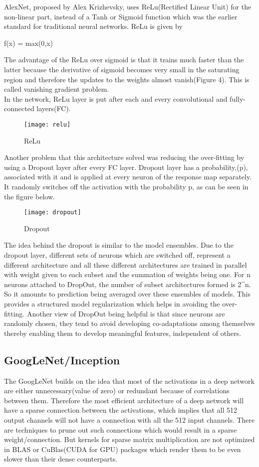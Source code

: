 \documentclass[../main.tex]{subfiles}
\begin{document}
AlexNet, proposed by Alex Krizhevsky, uses ReLu(Rectified Linear Unit) for the non-linear part, instead of a Tanh or Sigmoid function which was the earlier standard for traditional neural networks. ReLu is given by 

f(x) = max(0,x)

The advantage of the ReLu over sigmoid is that it trains much faster than the latter because the derivative of sigmoid becomes very small in the saturating region and therefore the updates to the weights almost vanish(Figure 4). This is called vanishing gradient problem.\\
In the network, ReLu layer is put after each and every convolutional and fully-connected layers(FC).

\begin{figure}[htbp] 
\centering 
\texttt{[image: relu]}
\caption{ReLu} 
\label{relu} 
\end{figure}
Another problem that this architecture solved was reducing the over-fitting by using a Dropout layer after every FC layer. Dropout layer has a probability,(p), associated with it and is applied at every neuron of the response map separately. It randomly switches off the activation with the probability p, as can be seen in the figure below.  

\begin{figure}[htbp] 
\centering 
\texttt{[image: dropout]}
\caption{Dropout} 
\label{dropout} 
\end{figure}
The idea behind the dropout is similar to the model ensembles. Due to the dropout layer, different sets of neurons which are switched off, represent a different architecture and all these different architectures are trained in parallel with weight given to each subset and the summation of weights being one. For n neurons attached to DropOut, the number of subset architectures formed is 2^n. So it amounts to prediction being averaged over these ensembles of models. This provides a structured model regularization which helps in avoiding the over-fitting. Another view of DropOut being helpful is that since neurons are randomly chosen, they tend to avoid developing co-adaptations among themselves thereby enabling them to develop meaningful features, independent of others.

\subsection{GoogLeNet/Inception}
The GoogLeNet builds on the idea that most of the activations in a deep network are either unnecessary(value of zero) or redundant because of correlations between them. Therefore the most efficient architecture of a deep network will have a sparse connection between the activations, which implies that all 512 output channels will not have a connection with all the 512 input channels. There are techniques to prune out such connections which would result in a sparse weight/connection. But kernels for sparse matrix multiplication are not optimized in BLAS or CuBlas(CUDA for GPU) packages which render them to be even slower than their dense counterparts.
\end{document}
